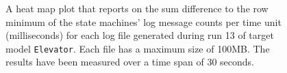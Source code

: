 \begin{figure}[htbp]
\centering
\begin{minipage}{1\textwidth}
  \centering
\end{minipage}
\caption{A heat map plot that reports on the sum difference to the row minimum of the state machines' log message counts per time unit (milliseconds) for each log file generated during run 13 of target model \texttt{Elevator}. Each file has a maximum size of 100MB. The results have been measured over a time span of 30 seconds.}
\label{figure:throughput_difference_elevator_13}
\end{figure}